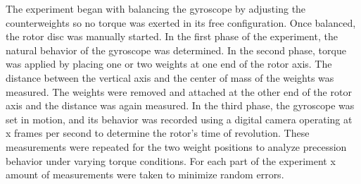 \begin{multicols}{2}
The experiment began with balancing the gyroscope by adjusting the counterweights so no torque was exerted in its free configuration. Once balanced, the rotor disc was manually started. In the first phase of the experiment, the natural behavior of the gyroscope was determined.
In the second phase, torque was applied by placing one or two weights at one end of the rotor axis. The distance between the vertical axis and the center of mass of the weights was measured. The weights were removed and attached at the other end of the rotor axis and the distance was again measured. 
In the third phase, the gyroscope was set in motion, and its behavior was recorded using a digital camera operating at x frames per second to determine the rotor’s time of revolution. These measurements were repeated for the two weight positions to analyze precession behavior under varying torque conditions.
For each part of the experiment x amount of measurements were taken to minimize random errors.

\end{multicols}

